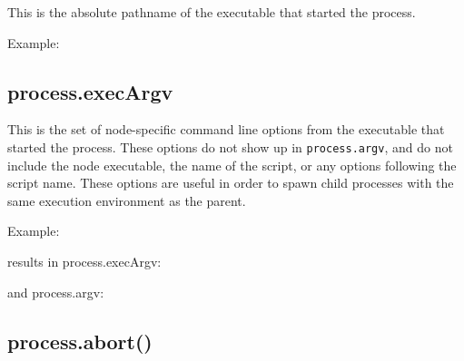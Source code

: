 This is the absolute pathname of the executable that started the
process.

Example:

\begin{Shaded}
\begin{Highlighting}[]
\end{Highlighting}
\end{Shaded}

\subsection{process.execArgv}\label{process.execargv}

This is the set of node-specific command line options from the
executable that started the process. These options do not show up in
\texttt{process.argv}, and do not include the node executable, the name
of the script, or any options following the script name. These options
are useful in order to spawn child processes with the same execution
environment as the parent.

Example:

\begin{Shaded}
\begin{Highlighting}[]
 
\end{Highlighting}
\end{Shaded}

results in process.execArgv:

\begin{Shaded}
\begin{Highlighting}[]
\NormalTok{[}\NormalTok{]}
\end{Highlighting}
\end{Shaded}

and process.argv:

\begin{Shaded}
\begin{Highlighting}[]
\NormalTok{[}\NormalTok{, }\NormalTok{, }\NormalTok{]}
\end{Highlighting}
\end{Shaded}

\subsection{process.abort()}\label{process.abort}

